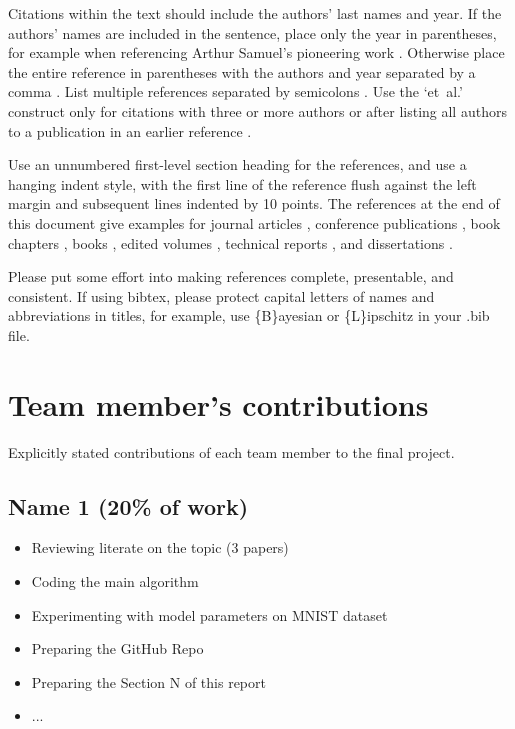 \documentclass{article}
\begin{document}
Citations within the text should include the authors' last names and
year. If the authors' names are included in the sentence, place only
the year in parentheses, for example when referencing Arthur Samuel's
pioneering work . Otherwise place the entire
reference in parentheses with the authors and year separated by a
comma \cite{Samuel59}. List multiple references separated by
semicolons \cite{kearns89,Samuel59,mitchell80}. Use the `et~al.'
construct only for citations with three or more authors or after
listing all authors to a publication in an earlier reference \cite{MachineLearningI}.

Use an unnumbered first-level section heading for the references, and use a
hanging indent style, with the first line of the reference flush against the
left margin and subsequent lines indented by 10 points. The references at the
end of this document give examples for journal articles \cite{Samuel59},
conference publications \cite{langley00}, book chapters \cite{Newell81}, books
\cite{DudaHart2nd}, edited volumes \cite{MachineLearningI}, technical reports
\cite{mitchell80}, and dissertations \cite{kearns89}.

Please put some effort into making references complete, presentable, and
consistent. If using bibtex, please protect capital letters of names and
abbreviations in titles, for example, use \{B\}ayesian or \{L\}ipschitz
in your .bib file.





\newpage
\appendix
\section{Team member's contributions}
\label{appendix-contrib}
Explicitly stated contributions of each team member to the final project.
\subsection*{Name 1 (20\% of work)}
\begin{itemize}
  \item Reviewing literate on the topic (3 papers)
  \item Coding the main algorithm
  \item Experimenting with model parameters on MNIST dataset
  \item Preparing the GitHub Repo
  \item Preparing the Section N of this report
  \item ...
\end{itemize}
\end{document}
